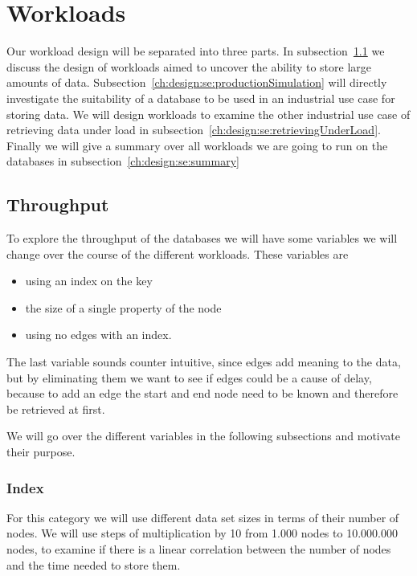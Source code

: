 \section{Workloads}
\label{ch:design:se:workloads}
Our workload design will be separated into three parts.
In subsection~\ref{ch:design:se:throughput} we discuss the design of workloads aimed to uncover the ability to store large amounts of data.
Subsection~\ref{ch:design:se:productionSimulation} will directly investigate the suitability of a database to be used in an industrial use case for storing data.
We will design workloads to examine the other industrial use case of retrieving data under load in subsection~\ref{ch:design:se:retrievingUnderLoad}.
Finally we will give a summary over all workloads we are going to run on the databases in subsection~\ref{ch:design:se:summary}

\pagebreak

\subsection{Throughput}
\label{ch:design:se:throughput}
To explore the throughput of the databases we will have some variables we will change over the course of the different workloads.
These variables are

\begin{itemize}
  \item using an index on the key
  \item the size of a single property of the node
  \item using no edges with an index.
\end{itemize}

The last variable sounds counter intuitive,
since edges add meaning to the data,
but by eliminating them we want to see if edges could be a cause of delay,
because to add an edge the start and end node need to be known and therefore be retrieved at first.

We will go over the different variables in the following subsections and motivate their purpose.

\subsubsection{Index}
\label{ch:design:se:index}
For this category we will use different data set sizes in terms of their number of nodes.
We will use steps of multiplication by 10 from 1.000 nodes to 10.000.000 nodes,
to examine if there is a linear correlation between the number of nodes and the time needed to store them.

